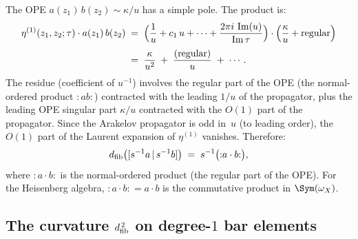 \begin{computation}
The OPE $a(z_1)\,b(z_2) \sim \kappa/u$ has a simple pole. The
product is:
\begin{align}\label{eq:propagator-times-OPE}
 \eta^{(1)}(z_1,z_2;\tau) \cdot a(z_1)\,b(z_2)
 &\;=\;
 \Bigl(\frac{1}{u} + c_1\,u + \cdots
 + \frac{2\pi i\,\operatorname{Im}(u)}{\operatorname{Im}\tau}
 \Bigr)
 \cdot
 \Bigl(\frac{\kappa}{u} + \text{regular}\Bigr)
 \notag\\[3pt]
 &\;=\;
 \frac{\kappa}{u^2}
 \;+\;
 \frac{(\text{regular})}{u}
 \;+\;
 \cdots.
\end{align}
The residue (coefficient of $u^{-1}$) involves the regular part
of the OPE (the normal-ordered product $:ab:$) contracted with
the leading $1/u$ of the propagator, plus the leading OPE singular
part $\kappa/u$ contracted with the $O(1)$ part of the propagator.
Since the Arakelov propagator is odd in~$u$ (to leading order),
the $O(1)$ part of the Laurent expansion of $\eta^{(1)}$ vanishes.
Therefore:
\begin{equation}\label{eq:dfib-result}
 d_{\mathrm{fib}}\bigl([s^{-1}a \,|\, s^{-1}b]\bigr)
 \;=\;
 s^{-1}\bigl({:}a \cdot b{:}\bigr),
\end{equation}
where ${:}a \cdot b{:}$ is the normal-ordered product (the regular
part of the OPE). For the Heisenberg algebra,
${:}a \cdot b{:} = a \cdot b$ is the commutative product in
$\Sym(\omega_X)$.
\end{computation}

\subsection{The curvature $d_{\mathrm{fib}}^{\,2}$ on degree-$1$ bar elements}
\label{subsec:dfib-sq-degree-1}

